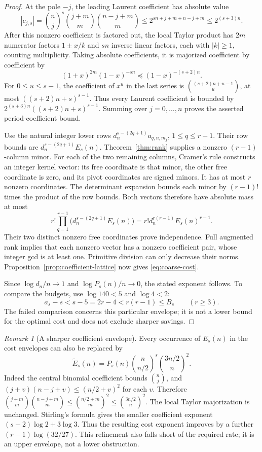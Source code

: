 \documentclass[11pt]{article}
\theoremstyle{remark}
\newtheorem{remark}[theorem]{Remark}
\begin{document}
\begin{proof}
At the pole \(-j\), the leading Laurent coefficient has absolute value
\[
 |c_{j,s}|=\binom nj^s\binom{j+m}m\binom{n-j+m}m
       \le2^{sn+j+m+n-j+m}\le2^{(s+3)n}.
\]
After this nonzero coefficient is factored out, the local Taylor product
has \(2m\) numerator factors \(1\pm x/k\) and \(sn\) inverse
linear factors, each with \(|k|\ge1\), counting multiplicity.
Taking absolute coefficients, it is majorized coefficient by coefficient
by
\[
 (1+x)^{2m}(1-x)^{-sn}\preccurlyeq(1-x)^{-(s+2)n}.
\]
For \(0\le u\le s-1\), the coefficient of \(x^u\) in the last
series is \(\binom{(s+2)n+u-1}{u}\), at most
\(((s+2)n+s)^{s-1}\). Thus every Laurent coefficient is bounded
by \(2^{(s+3)n}((s+2)n+s)^{s-1}\). Summing over \(j=0,\ldots,n\)
proves the asserted period-coefficient bound.

Use the natural integer lower rows
\(d_n^{s-(2q+1)}a_{q,n,m_j}\), \(1\le q\le r-1\).
Their row bounds are \(d_n^{s-(2q+1)}E_s(n)\).
Theorem~\ref{thm:rank} supplies a nonzero \((r-1)\)-column minor.
For each of the two remaining columns, Cramer's rule constructs an
integer kernel vector: its free coordinate is that minor, the other
free coordinate is zero, and its pivot coordinates are signed minors.
It has at most \(r\) nonzero coordinates. The determinant expansion
bounds each minor by \((r-1)!\) times the product of the row bounds.
Both vectors therefore have absolute mass at most
\[
 r!\prod_{q=1}^{r-1}
       \bigl(d_n^{s-(2q+1)}E_s(n)\bigr)
   =r!d_n^{r(r-1)}E_s(n)^{r-1}.
\]
Their two distinct nonzero free coordinates prove independence.
Full augmented rank implies that each nonzero vector has a nonzero
coefficient pair, whose integer gcd is at least one. Primitive division
can only decrease their norms. Proposition~\ref{prop:coefficient-lattice}
now gives \eqref{eq:coarse-cost}.

Since \(\log d_n/n\to1\) and \(\log P_s(n)/n\to0\), the
stated exponent follows. To compare the budgets, use
\(\log140<5\) and \(\log4<2\):
\[
 a_s-s<s-5=2r-4<r(r-1)\le B_s\qquad(r\ge3).
\]
The failed comparison concerns this particular envelope; it is not a
lower bound for the optimal cost and does not exclude sharper savings.
\end{proof}

\begin{remark}[A sharper coefficient envelope]
Every occurrence of \(E_s(n)\) in the cost envelopes can also be replaced by
\[
 \widetilde E_s(n)=P_s(n)\binom n{n/2}^{s}\binom{3n/2}n^2.
\]
Indeed the central binomial coefficient bounds \(\binom nj\), and
\((j+v)(n-j+v)\le(n/2+v)^2\) for each \(v\). Therefore
\(\binom{j+m}m\binom{n-j+m}m\le\binom{n/2+m}m^2
\le\binom{3n/2}n^2\). The local Taylor majorization is unchanged.
Stirling's formula gives the smaller coefficient exponent
\((s-2)\log2+3\log3\). Thus the resulting cost exponent improves
by a further \((r-1)\log(32/27)\). This refinement also falls short
of the required rate; it is an upper envelope, not a lower obstruction.
\end{remark}
\end{document}
